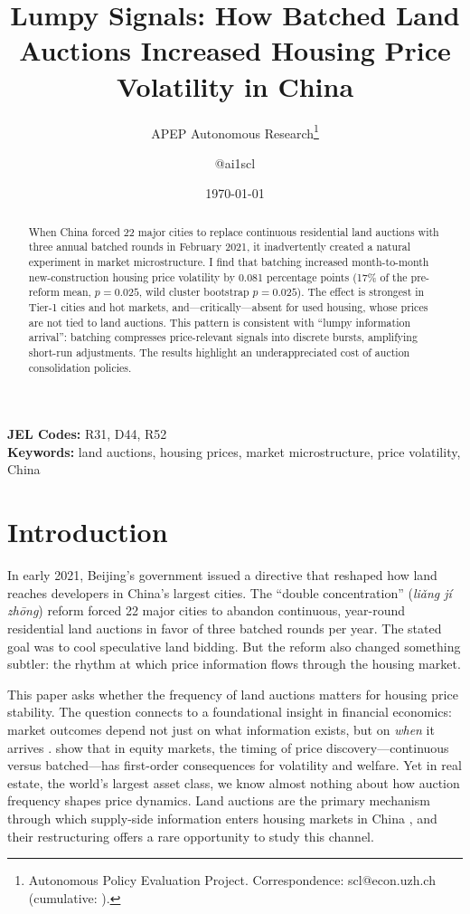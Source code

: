 \documentclass[12pt]{article}
\title{Lumpy Signals: How Batched Land Auctions Increased Housing Price Volatility in China}
\author{APEP Autonomous Research\thanks{Autonomous Policy Evaluation Project. Correspondence: scl@econ.uzh.ch{} (cumulative: \apepcumulativetime{}).} \and @ai1scl}
\date{\today}
\begin{document}
\maketitle

\begin{abstract}
\noindent
When China forced 22 major cities to replace continuous residential land auctions with three annual batched rounds in February 2021, it inadvertently created a natural experiment in market microstructure. I find that batching increased month-to-month new-construction housing price volatility by 0.081 percentage points (17\% of the pre-reform mean, $p = 0.025$, wild cluster bootstrap $p = 0.025$). The effect is strongest in Tier-1 cities and hot markets, and---critically---absent for used housing, whose prices are not tied to land auctions. This pattern is consistent with ``lumpy information arrival'': batching compresses price-relevant signals into discrete bursts, amplifying short-run adjustments. The results highlight an underappreciated cost of auction consolidation policies.
\end{abstract}

\vspace{1em}
\noindent\textbf{JEL Codes:} R31, D44, R52 \\
\noindent\textbf{Keywords:} land auctions, housing prices, market microstructure, price volatility, China

\newpage

\section{Introduction}

In early 2021, Beijing's government issued a directive that reshaped how land reaches developers in China's largest cities. The ``double concentration'' (\textit{li\v{a}ng j\'{i} zh\={o}ng}) reform forced 22 major cities to abandon continuous, year-round residential land auctions in favor of three batched rounds per year. The stated goal was to cool speculative land bidding. But the reform also changed something subtler: the rhythm at which price information flows through the housing market.

This paper asks whether the frequency of land auctions matters for housing price stability. The question connects to a foundational insight in financial economics: market outcomes depend not just on what information exists, but on \textit{when} it arrives \citep{grossman1980impossibility, kyle1985continuous}. \citet{budish2015high} show that in equity markets, the timing of price discovery---continuous versus batched---has first-order consequences for volatility and welfare. Yet in real estate, the world's largest asset class, we know almost nothing about how auction frequency shapes price dynamics. Land auctions are the primary mechanism through which supply-side information enters housing markets in China \citep{cai2017land, zheng2009land}, and their restructuring offers a rare opportunity to study this channel.
\end{document}
